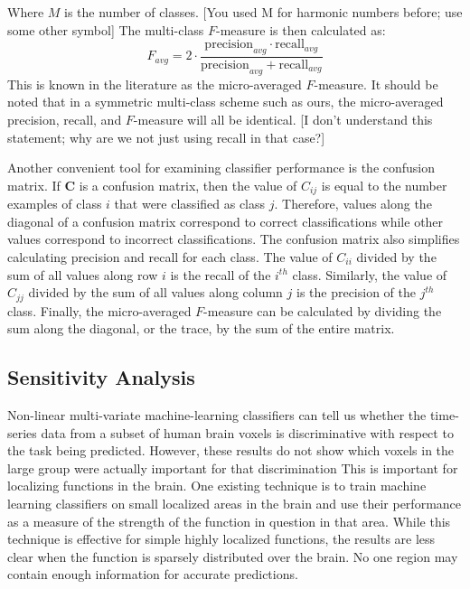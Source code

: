 \documentclass[final]{article}
\begin{document}
Where $M$ is the number of classes. [You used M for harmonic numbers before; use some other symbol]
The multi-class $F$-measure is then calculated as:
\begin{equation}
F_{avg} = 2 \cdot \frac{\mbox{precision}_{avg} \cdot \mbox{recall}_{avg}}{\mbox{precision}_{avg} + \mbox{recall}_{avg}}
\end{equation}
This is known in the literature as the  micro-averaged $F$-measure.
It should be noted that in a symmetric multi-class scheme such as ours, the micro-averaged precision, 
recall, and $F$-measure will all be identical. [I don't understand this statement; why are we not just using recall in that case?]

Another convenient tool for examining classifier performance is the confusion matrix.
If $\mathbf{C}$ is a confusion matrix, then the value of $C_{ij}$ is equal to the number examples of class $i$ that were classified as class $j$.
Therefore, values along the diagonal of a confusion matrix correspond to correct classifications while other values correspond to incorrect classifications.
The confusion matrix also simplifies calculating precision and recall for each class.
The value of $C_{ii}$ divided by the sum of all values along row $i$ is the recall of the $i^{th}$ class.
Similarly, the value of $C_{jj}$ divided by the sum of all values along column $j$ is the precision of the $j^{th}$ class.
Finally, the micro-averaged $F$-measure can be calculated by dividing the sum along the diagonal, or the trace, by the sum of the entire matrix.

\subsection{Sensitivity Analysis}
Non-linear multi-variate machine-learning classifiers can tell us whether the time-series data from a 
subset of human brain voxels is discriminative with respect to the task being predicted. However, these 
results do not show which voxels in the large group were actually important for that discrimination
This is important for localizing functions in the brain.
One existing technique is to train machine learning classifiers on small localized areas in the brain and use their performance as a measure of the strength of the function in question in that area.
While this technique is effective for simple highly localized functions, the results are less clear when the function is sparsely distributed over the brain.
No one region may contain enough information for accurate predictions.
\end{document}
